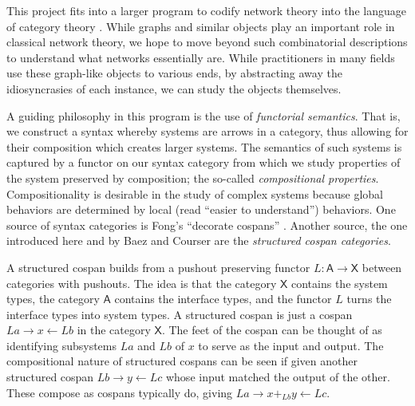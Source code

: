 \documentclass{amsart}
\newcommand{\A}{\cat{A}}
\newcommand{\X}{\cat{X}}
\newcommand{\cat}[1]{\mathsf{#1}}
\newcommand{\from}{\colon}
\renewcommand{\gets}{\leftarrow}
\theoremstyle{remark}
\theoremstyle{definition}
\begin{document}
This project fits into a larger program to codify network theory into
the language of category theory
\cite{OpenPetri,RxNets,PassiveNets,NetMods,MrkvProc}.  While graphs
and similar objects play an important role in classical network
theory, we hope to move beyond such combinatorial descriptions to
understand what networks essentially are. While practitioners in many
fields use these graph-like objects to various ends, by abstracting
away the idiosyncrasies of each instance, we can study the objects
themselves.

A guiding philosophy in this program is the use of \emph{functorial
  semantics}. That is, we construct a syntax whereby systems are
arrows in a category, thus allowing for their composition which
creates larger systems.  The semantics of such systems is captured by
a functor on our syntax category from which we study properties of the
system preserved by composition; the so-called \emph{compositional
  properties}. Compositionality is desirable in the study of complex
systems because global behaviors are determined by local (read
``easier to understand'') behaviors. One source of syntax categories
is Fong's ``decorate cospans'' \cite{DecorCsp}. Another source, the
one introduced here and by Baez and Courser \cite{StrCsp} are the
\emph{structured cospan categories}.

A structured cospan builds from a pushout preserving functor
$ L \from \A \to \X $ between categories with pushouts.  The idea is
that the category $ \X $ contains the system types, the category
$ \A $ contains the interface types, and the functor $ L $ turns the
interface types into system types. A structured cospan is just a
cospan $ La \to x \gets Lb $ in the category $ \X $.  The feet of the
cospan can be thought of as identifying subsystems $ La $ and $ Lb $
of $ x $ to serve as the input and output. The compositional nature of
structured cospans can be seen if given another structured cospan
$ Lb \to y \gets Lc $ whose input matched the output of the other.
These compose as cospans typically do, giving
$ La \to x+_{Lb} y \gets Lc $.
\end{document}
